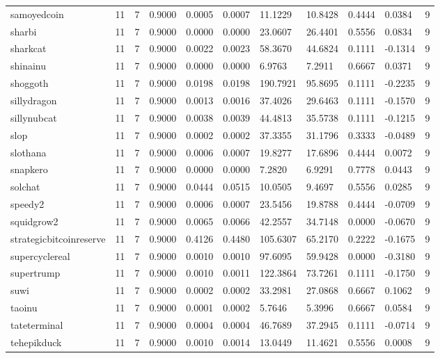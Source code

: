 \begin{table}[htbp]
\begin{tabular}{lllllllllll}
samoyedcoin & 11 & 7 & 0.9000 & 0.0005 & 0.0007 & 11.1229 & 10.8428 & 0.4444 & 0.0384 & 9 \\
sharbi & 11 & 7 & 0.9000 & 0.0000 & 0.0000 & 23.0607 & 26.4401 & 0.5556 & 0.0834 & 9 \\
sharkcat & 11 & 7 & 0.9000 & 0.0022 & 0.0023 & 58.3670 & 44.6824 & 0.1111 & -0.1314 & 9 \\
shinainu & 11 & 7 & 0.9000 & 0.0000 & 0.0000 & 6.9763 & 7.2911 & 0.6667 & 0.0371 & 9 \\
shoggoth & 11 & 7 & 0.9000 & 0.0198 & 0.0198 & 190.7921 & 95.8695 & 0.1111 & -0.2235 & 9 \\
sillydragon & 11 & 7 & 0.9000 & 0.0013 & 0.0016 & 37.4026 & 29.6463 & 0.1111 & -0.1570 & 9 \\
sillynubcat & 11 & 7 & 0.9000 & 0.0038 & 0.0039 & 44.4813 & 35.5738 & 0.1111 & -0.1215 & 9 \\
slop & 11 & 7 & 0.9000 & 0.0002 & 0.0002 & 37.3355 & 31.1796 & 0.3333 & -0.0489 & 9 \\
slothana & 11 & 7 & 0.9000 & 0.0006 & 0.0007 & 19.8277 & 17.6896 & 0.4444 & 0.0072 & 9 \\
snapkero & 11 & 7 & 0.9000 & 0.0000 & 0.0000 & 7.2820 & 6.9291 & 0.7778 & 0.0443 & 9 \\
solchat & 11 & 7 & 0.9000 & 0.0444 & 0.0515 & 10.0505 & 9.4697 & 0.5556 & 0.0285 & 9 \\
speedy2 & 11 & 7 & 0.9000 & 0.0006 & 0.0007 & 23.5456 & 19.8788 & 0.4444 & -0.0709 & 9 \\
squidgrow2 & 11 & 7 & 0.9000 & 0.0065 & 0.0066 & 42.2557 & 34.7148 & 0.0000 & -0.0670 & 9 \\
strategicbitcoinreserve & 11 & 7 & 0.9000 & 0.4126 & 0.4480 & 105.6307 & 65.2170 & 0.2222 & -0.1675 & 9 \\
supercyclereal & 11 & 7 & 0.9000 & 0.0010 & 0.0010 & 97.6095 & 59.9428 & 0.0000 & -0.3180 & 9 \\
supertrump & 11 & 7 & 0.9000 & 0.0010 & 0.0011 & 122.3864 & 73.7261 & 0.1111 & -0.1750 & 9 \\
suwi & 11 & 7 & 0.9000 & 0.0002 & 0.0002 & 33.2981 & 27.0868 & 0.6667 & 0.1062 & 9 \\
taoinu & 11 & 7 & 0.9000 & 0.0001 & 0.0002 & 5.7646 & 5.3996 & 0.6667 & 0.0584 & 9 \\
tateterminal & 11 & 7 & 0.9000 & 0.0004 & 0.0004 & 46.7689 & 37.2945 & 0.1111 & -0.0714 & 9 \\
tehepikduck & 11 & 7 & 0.9000 & 0.0010 & 0.0014 & 13.0449 & 11.4621 & 0.5556 & 0.0008 & 9 \\

\end{tabular}
\end{table}
